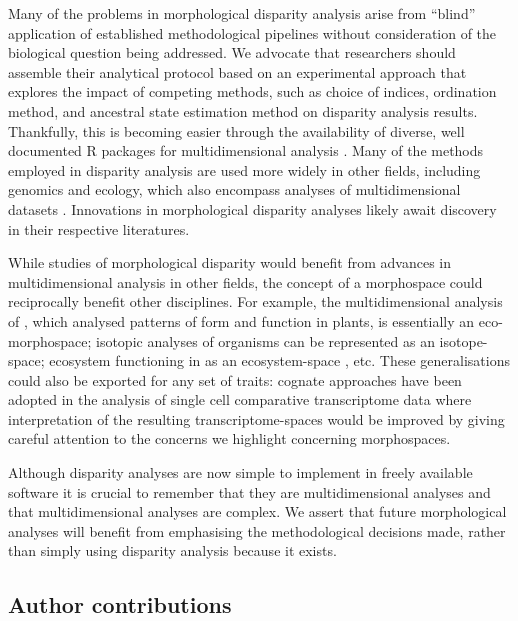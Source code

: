 \documentclass[12pt,letterpaper]{article}
\begin{document}
Many of the problems in morphological disparity analysis arise from ``blind'' application of established methodological pipelines without consideration of the biological question being addressed.
We advocate that researchers should assemble their analytical protocol based on an experimental approach that explores the impact of competing methods, such as choice of indices, ordination method, and ancestral state estimation method on disparity analysis results.
Thankfully, this is becoming easier through the availability of diverse, well documented R packages for multidimensional analysis \citep{Bouxin2005, oksanen2007vegan, Harmon2008, lloyd2016, Guillerme2018b}.
Many of the methods employed in disparity analysis are used more widely in other fields, including genomics and ecology, which also encompass analyses of multidimensional datasets \citep{Donohue2013, Saupe2015, Canter2018, mammola2019}.
Innovations in morphological disparity analyses likely await discovery in their respective literatures.

While studies of morphological disparity would benefit from advances in multidimensional analysis in other fields, the concept of a morphospace could reciprocally benefit other disciplines.
For example, the multidimensional analysis of \citep{Diaz2016}, which analysed patterns of form and function in plants, is essentially an eco-morphospace; isotopic analyses of organisms \citep{Jackson2011,Swanson2015} can be represented as an isotope-space; ecosystem functioning in \citealt{Donohue2013} as an ecosystem-space \citep{qiao2017}, etc.
These generalisations could also be exported for any set of traits: cognate approaches have been adopted in the analysis of single cell comparative transcriptome data \citep{Sebe-Pedros2018} where interpretation of the resulting transcriptome-spaces would be improved by giving careful attention to the concerns we highlight concerning morphospaces.

Although disparity analyses are now simple to implement in freely available software \citep{Bouxin2005, oksanen2007vegan, Harmon2008, lloyd2016, Guillerme2018b} it is crucial to remember that they are multidimensional analyses and that multidimensional analyses are complex.
We assert that future morphological analyses will benefit from emphasising the methodological decisions made, rather than simply using disparity analysis because it exists.

\subsection{Author contributions}
\end{document}
